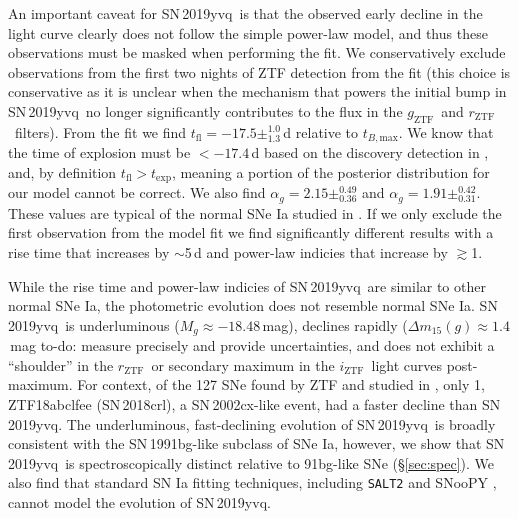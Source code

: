 \documentclass[twocolumn]{aastex63}
\newcommand{\todo}[1]{{\color{magenta} to-do: {#1}}}
\newcommand{\rztf}{$r_\mathrm{ZTF}$}
\newcommand{\gztf}{$g_\mathrm{ZTF}$}
\newcommand{\iztf}{$i_\mathrm{ZTF}$}
\newcommand{\tfl}{$t_\mathrm{fl}$}
\newcommand{\tbmax}{$t_{B,\mathrm{max}}$}
\newcommand{\sn}{SN\,2019yvq}
\begin{document}
An important caveat for \sn\ is that the observed early decline in the light
curve clearly does not follow the simple power-law model, and thus these
observations must be masked when performing the fit. We conservatively
exclude observations from the first two nights of ZTF detection from the fit
(this choice is conservative as it is unclear when the mechanism that powers
the initial bump in \sn\ no longer significantly contributes to the flux in
the \gztf\ and \rztf\ filters). From the fit we find \tfl$ = -17.5
\pm^{1.0}_{1.3}$\,d relative to \tbmax. We know that the time of explosion
must be $< -17.4$\,d based on the discovery detection in \citealt{Itagaki19},
and, by definition \tfl$> t_\mathrm{exp}$, meaning a portion of the posterior
distribution for our model cannot be correct. We also find $\alpha_g = 2.15
\pm^{0.49}_{0.36}$ and $\alpha_g = 1.91 \pm^{0.42}_{0.31}$. These values are
typical of the normal SNe Ia studied in \citet{Miller20}. If we only exclude
the first observation from the model fit we find significantly different
results with a rise time that increases by $\sim$5\,d and power-law indicies
that increase by $\gtrsim$1.

While the rise time and power-law indicies of \sn\ are similar to other
normal SNe Ia, the photometric evolution does not resemble normal SNe Ia.
\sn\ is underluminous ($M_g \approx -18.48$\,mag), declines rapidly ($\Delta
m_{15}(g) \approx 1.4$\,mag \todo{measure precisely and provide
uncertainties}, and does not exhibit a ``shoulder'' in the \rztf\ or
secondary maximum in the \iztf\ light curves post-maximum. For context, of
the 127 SNe found by ZTF and studied in \citet{Yao19}, only 1, ZTF18abclfee
(SN\,2018crl), a SN\,2002cx-like event, had a faster decline than \sn. The
underluminous, fast-declining evolution of \sn\ is broadly consistent with
the SN\,1991bg-like subclass of SNe Ia, however, we show that \sn\ is
spectroscopically distinct relative to 91bg-like SNe (\S\ref{sec:spec}). We
also find that standard SN Ia fitting techniques, including \texttt{SALT2}
\citep{Guy07} and SNooPY \citep{Burns11}, cannot model the evolution of \sn.
\end{document}
